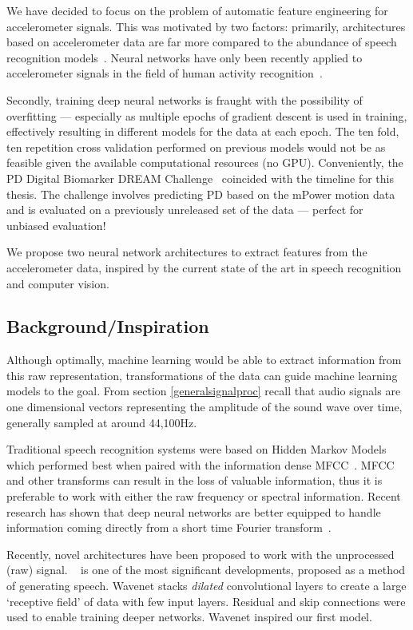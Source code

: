\documentclass[12pt, twoside]{book}
\renewcommand\emph[1]{\textit{\color{USred}{#1}}}
\begin{document}
We have decided to focus on the problem of automatic feature engineering for accelerometer signals. This was motivated by two factors: primarily, architectures based on accelerometer data are far more compared to the abundance of speech recognition models~\cite{convlstm, wavenet}. Neural networks have only been recently applied to accelerometer signals in the field of human activity recognition~\cite{deepconvlstm}.  

Secondly, training deep neural networks is fraught with the possibility of overfitting --- especially as multiple epochs of gradient descent is used in training, effectively resulting in different models for the data at each epoch. The ten fold, ten repetition cross validation performed on previous models would not be as feasible given the available computational resources (no GPU). Conveniently, the PD Digital Biomarker DREAM Challenge~\cite{dreamchallengeinfo} coincided with the timeline for this thesis. The challenge involves predicting PD based on the mPower motion data and is evaluated on a previously unreleased set of the data --- perfect for unbiased evaluation!

We propose two neural network architectures to extract features from the accelerometer data, inspired by the current state of the art in speech recognition and computer vision. 

\subsection{Background/Inspiration}
Although optimally, machine learning would be able to extract information from this raw representation, transformations of the data can guide machine learning models to the goal. From section \ref{generalsignalproc} recall that audio signals are one dimensional vectors representing the amplitude of the sound wave over time, generally sampled at around 44,100Hz. 

Traditional speech recognition systems were based on Hidden Markov Models which performed best when paired with the information dense MFCC~\cite{hinton2012speech}. MFCC and other transforms can result in the loss of valuable information, thus it is preferable to work with either the raw frequency or spectral information. Recent research has shown that deep neural networks are better equipped to handle information coming directly from a short time Fourier transform~\cite{microsoftspeech}. 

Recently, novel architectures have been proposed to work with the unprocessed (raw) signal. \emph{Wavenet}~\cite{wavenet} is one of the most significant developments, proposed as a method of generating speech. Wavenet stacks \textit{dilated} convolutional layers to create a large `receptive field' of data with few input layers. Residual and skip connections were used to enable training deeper networks. Wavenet inspired our first model.
\end{document}
